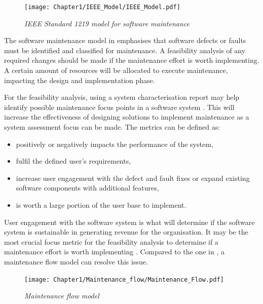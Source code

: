\begin{figure}[!htb]
	\centering %
	\texttt{[image: Chapter1/IEEE\_Model/IEEE\_Model.pdf]}
	\caption[IEEE Standard 1219 model for software maintenance]
	{\textit{IEEE Standard 1219 model for software maintenance \cite{Ren2011}}} \label{fig:ch1_ieeeModel}
\end{figure}

The software maintenance model in  emphasises that software defects or faults must be identified and classified for maintenance. A feasibility analysis of any required changes should be made if the maintenance effort is worth implementing. A certain amount of resources will be allocated to execute maintenance, impacting the design and implementation phase.\par For the feasibility analysis, using a system characterisation report may help identify possible maintenance focus points in a software system \cite{Araujo2021}. This will increase the effectiveness of designing solutions to implement maintenance as a system assessment focus can be made. The metrics can be defined as:

\begin{itemize}
	\item positively or negatively impacts the performance of the system,
	\item fulfil the defined user's requirements,
	\item increase user engagement with the defect and fault fixes or expand existing software components with additional features,
	\item is worth a large portion of the user base to implement.
\end{itemize}

User engagement with the software system is what will determine if the software system is sustainable in generating revenue for the organisation. It may be the most crucial focus metric for the feasibility analysis to determine if a maintenance effort is worth implementing \cite{Araujo2021}. Compared to the one in , a maintenance flow model can resolve this issue.  

\begin{figure}[!htb]
	\centering %
	\texttt{[image: Chapter1/Maintenance\_flow/Maintenance\_Flow.pdf]}
	\caption[Maintenance flow model]
	{\textit{Maintenance flow model \cite{Tang2010}}} \label{fig:ch1_maintenanceFlow}
\end{figure}

